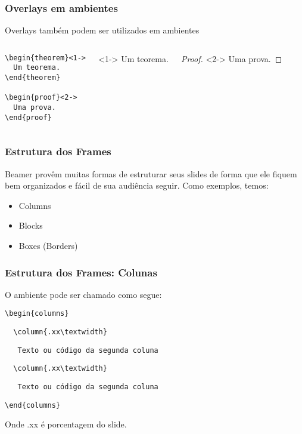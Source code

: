\begin{frame}[fragile]
\frametitle{Overlays em ambientes}

Overlays também podem ser utilizados em ambientes

\begin{columns}
	\scriptsize
\begin{verbatim}
\begin{theorem}<1->
  Um teorema.
\end{theorem}

\begin{proof}<2->
  Uma prova.
\end{proof}
\end{verbatim}
	\scriptsize
\begin{theorem}<1->
   Um teorema.
  \end{theorem}
  \begin{proof}<2->
   Uma prova.
  \end{proof}
\end{columns}

\end{frame}


\begin{frame}
\frametitle{Estrutura dos Frames}
Beamer provêm muitas formas de estruturar seus slides de forma que ele fiquem bem
organizados e fácil de sua audiência seguir. Como exemplos, temos:

\begin{itemize}
  \item Columns
  \item Blocks
  \item Boxes (Borders)
\end{itemize}
\end{frame}

\begin{frame}[fragile]
\frametitle{Estrutura dos Frames: Colunas}

O ambiente pode ser chamado como segue:

\begin{block}{}
\small
\verb|\begin{columns}|

\verb|  \column{.xx\textwidth}|

\verb|   Texto ou código da segunda coluna|

\verb|  \column{.xx\textwidth}|

\verb|   Texto ou código da segunda coluna|

\verb|\end{columns}|
\end{block}

Onde \alert{.xx} é porcentagem do slide. 
\end{frame}


